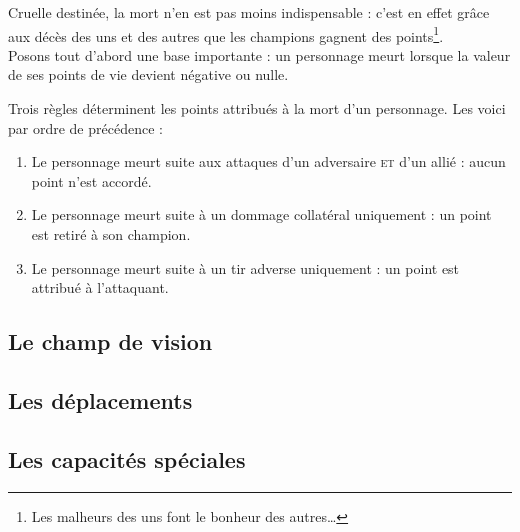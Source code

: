 Cruelle destinée, la mort n'en est pas moins indispensable : c'est en
effet grâce aux décès des uns et des autres que les champions gagnent
des points\footnote{Les malheurs des uns font le bonheur des autres\ldots{}}.\\

Posons tout d'abord une base importante : un personnage meurt lorsque
la valeur de ses points de vie devient négative ou nulle.

Trois règles déterminent les points attribués à la mort d'un
personnage. Les voici par ordre de précédence :

\begin{enumerate}
\item Le personnage meurt suite aux attaques d'un adversaire
  \textsc{et} d'un allié : aucun point n'est accordé.
\item Le personnage meurt suite à un dommage collatéral uniquement : un point est
  retiré à son champion.
\item Le personnage meurt suite à un tir adverse uniquement : un point
  est attribué à l'attaquant.
\end{enumerate}

\subsection{Le champ de vision}

\subsection{Les déplacements}

\subsection{Les capacités spéciales}

